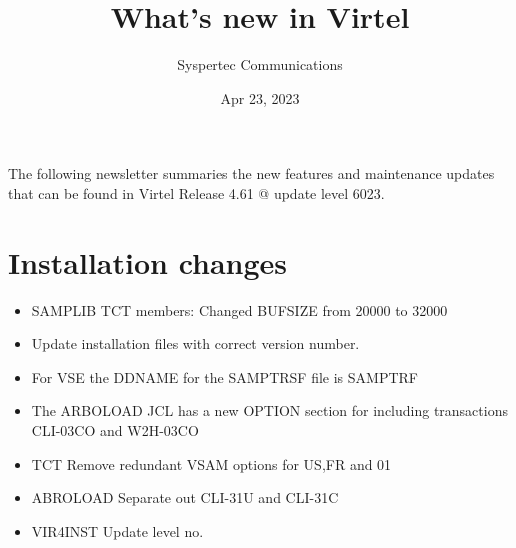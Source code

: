\documentclass[letterpaper,10pt,english]{sphinxmanual}
\title{What's new in Virtel}
\date{Apr 23, 2023}
\author{Syspertec Communications}
\begin{document}
\pagestyle{empty}
\sphinxmaketitle
\pagestyle{plain}
\sphinxtableofcontents
\pagestyle{normal}
\label{\detokenize{TN202303::doc}}


The following newsletter summaries the new features and maintenance updates that can be found in Virtel Release 4.61 @ update level 6023.


\chapter{Installation changes}
\label{\detokenize{TN202303:installation-changes}}
\begin{itemize}
\item {} 
SAMPLIB TCT members: Changed BUFSIZE from 20000 to 32000

\end{itemize}

\begin{itemize}
\item {} 
Update installation files with correct version number.

\end{itemize}

\begin{itemize}
\item {} 
For VSE the DDNAME for the SAMPTRSF file is SAMPTRF

\end{itemize}

\begin{itemize}
\item {} 
The ARBOLOAD JCL has a new OPTION section for including transactions CLI-03CO and W2H-03CO

\end{itemize}

\begin{itemize}
\item {} 
TCT                           Remove redundant VSAM options for US,FR and 01

\item {} 
ABROLOAD                  Separate out CLI-31U and CLI-31C

\item {} 
VIR4INST                  Update level no.

\end{itemize}
\end{document}
